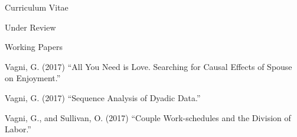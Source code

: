 \documentclass[12pt,a4paper]{article}
\begin{document}
\begin{cv}{Curriculum Vitae}
\begin{cvlist}{Under Review}
 \end{cvlist}

  \begin{cvlist}{Working Papers}

  	\item Vagni, G. (2017) ``All You Need is Love. Searching for Causal Effects of Spouse on Enjoyment.'' 
  	 \item Vagni, G. (2017)  ``Sequence Analysis of Dyadic Data.'' 
  	\item Vagni, G., and Sullivan, O. (2017)  ``Couple Work-schedules and the Division of Labor.''
  	
  	\end{cvlist}

  \date{~February~2018}
\end{cv}
\end{document}
